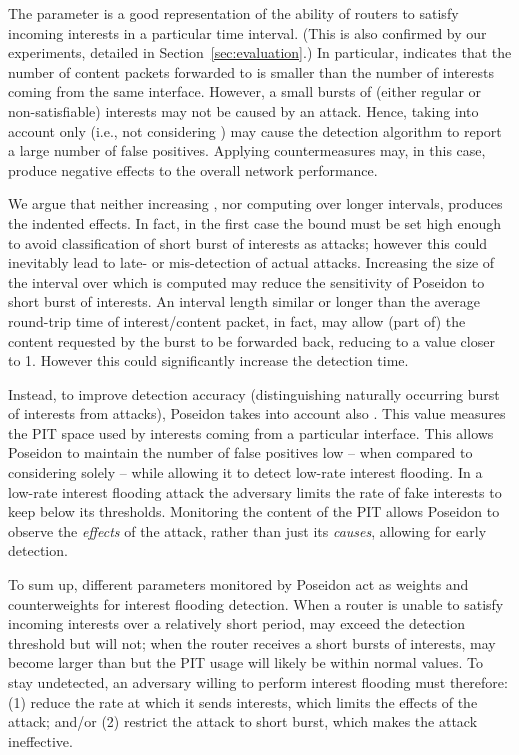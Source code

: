 \documentclass[10pt,conference,letterpaper]{IEEEtran}
\begin{document}
The parameter   is a good representation of the ability of routers to 
satisfy incoming interests in a particular time interval. (This is also confirmed by our 
experiments, detailed in Section~\ref{sec:evaluation}.) 
In particular,  indicates that the number of content packets 
forwarded to    is smaller than the number of interests coming from the same 
interface. However, a small bursts of (either regular or non-satisfiable) interests may 
not be caused by an attack.
Hence, taking into account only  (i.e., not considering ) may cause the detection algorithm to 
report a large number of false positives. 
Applying countermeasures may, in this case, produce negative effects to the 
overall network performance.

We argue that neither increasing , nor computing  over 
longer intervals, produces the indented effects. In fact, in the 
first case the bound must be set high enough to avoid classification of short  burst of 
interests  as  attacks; however this could inevitably lead to late- or mis-detection of 
actual attacks. 
Increasing the size of the interval over which   is computed may reduce the 
sensitivity of Poseidon to short burst of interests. An interval length similar or longer 
than the average round-trip time of interest/content packet, in fact, may allow (part of) 
the content requested by the burst to be forwarded back, reducing  to 
a value closer to 1.
However this could significantly increase the detection time.
 

Instead, to improve detection accuracy (distinguishing naturally occurring burst of 
interests from attacks), Poseidon takes into account also . This value 
measures the PIT space used by interests coming from a particular interface.  
This allows Poseidon to maintain the number of false positives low -- when compared to 
considering solely  -- while allowing it to detect low-rate interest flooding. 
In a low-rate interest flooding attack the adversary limits the rate of fake interests to keep  below its thresholds. Monitoring the content of the PIT allows Poseidon to observe 
the {\em effects} of the attack, rather than just its {\em causes}, allowing for early detection.

To sum up, different parameters monitored by Poseidon act as weights and counterweights 
for interest flooding detection. When a router is unable to satisfy incoming interests over a relatively short period,  may exceed the detection threshold but  will not; when the router receives a short bursts of interests,  may become larger than  but the PIT usage will likely be within normal values. To stay undetected, an adversary willing to perform interest flooding  must therefore: (1) reduce the rate at which it sends interests, which limits the effects of the attack; and/or (2) restrict the attack to short burst, which makes the attack ineffective.
\end{document}
